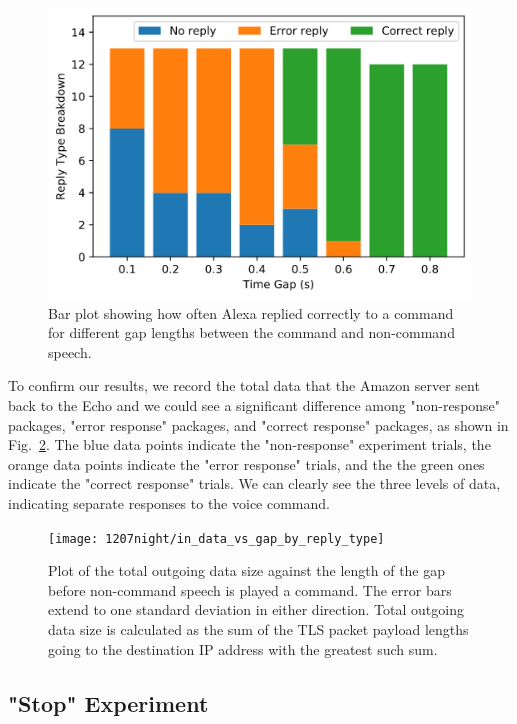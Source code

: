 \begin{figure}[ht]
	\centering
	\includegraphics[scale=0.4]{../measurement/results/1207night/reply_type_breakdown}
	\caption{Bar plot showing how often Alexa replied correctly to a command for different gap lengths between the command and non-command speech.}
	\label{fig:gap}
	\vspace{-3mm}
	\end{figure}

To confirm our results, we record the total data that the Amazon server sent back to the Echo and we could see a significant difference among "non-response" packages, "error response" packages, and "correct response" packages, as shown in Fig.~\ref{fig:postfix_variablegap_sizes}. The blue data points indicate the "non-response" experiment trials, the orange data points indicate the "error response" trials, and the the green ones indicate the "correct response" trials. We can clearly see the three levels of data, indicating separate responses to the voice command.

\begin{figure}[]
    \centering
    \texttt{[image: 1207night/in\_data\_vs\_gap\_by\_reply\_type]}
    \caption{Plot of the total outgoing data size against the length of the gap before non-command speech is played a command. The error bars extend to one standard deviation in either direction. Total outgoing data size is calculated as the sum of the TLS packet payload lengths going to the destination IP address with the greatest such sum.}
    \label{fig:postfix_variablegap_sizes}
\end{figure}


\subsection{"Stop" Experiment}

